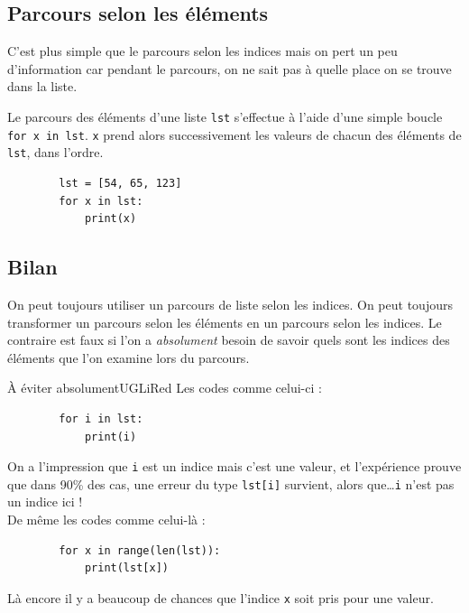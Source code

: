 \subsection{Parcours selon les éléments}

C'est plus simple que le parcours selon les indices mais on pert un peu d'information car pendant le parcours, on ne sait pas à quelle place on se trouve dans la liste.

\begin{definition}
	Le parcours des éléments d'une liste \texttt{lst} s'effectue à l'aide d'une simple boucle \texttt{for x in lst}. \texttt{x} prend alors successivement les valeurs de chacun des éléments de \texttt{lst}, dans l'ordre.  
\end{definition}
\begin{exemple}
	\begin{verbatim}
		lst = [54, 65, 123]
		for x in lst:
			print(x)
		\end{verbatim}
\end{exemple}

\subsection{Bilan}

On peut toujours utiliser un parcours de liste selon les indices.
On peut toujours transformer un parcours selon les éléments en un parcours selon les indices.
Le contraire est faux si l'on a \textit{absolument} besoin de savoir quels sont les indices des éléments que l'on examine lors du parcours.

\begin{encadrecolore}{À éviter absolument}{UGLiRed}
	Les codes comme celui-ci : 
	\begin{verbatim}
		for i in lst:
			print(i)
	\end{verbatim}
	On a l'impression que \texttt{i} est un indice mais c'est une valeur, et l'expérience prouve que dans 90\% des cas, une erreur du type \texttt{lst[i]} survient, alors que\ldots \texttt{i} n'est pas un indice ici !\\

	De même les codes comme celui-là :
	\begin{verbatim}
		for x in range(len(lst)):
			print(lst[x])
	\end{verbatim}
	Là encore il y a beaucoup de chances que l'indice \texttt{x} soit pris pour une valeur. 
\end{encadrecolore}

